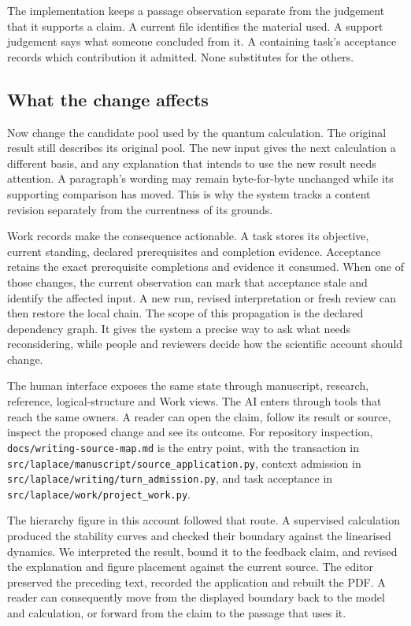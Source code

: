 The implementation keeps a passage observation separate from the judgement that it supports a claim. A current file identifies the material used. A support judgement says what someone concluded from it. A containing task's acceptance records which contribution it admitted. None substitutes for the others.

\subsection{What the change affects}
Now change the candidate pool used by the quantum calculation. The original result still describes its original pool. The new input gives the next calculation a different basis, and any explanation that intends to use the new result needs attention. A paragraph's wording may remain byte-for-byte unchanged while its supporting comparison has moved. This is why the system tracks a content revision separately from the currentness of its grounds.

Work records make the consequence actionable. A task stores its objective, current standing, declared prerequisites and completion evidence. Acceptance retains the exact prerequisite completions and evidence it consumed. When one of those changes, the current observation can mark that acceptance stale and identify the affected input. A new run, revised interpretation or fresh review can then restore the local chain. The scope of this propagation is the declared dependency graph. It gives the system a precise way to ask what needs reconsidering, while people and reviewers decide how the scientific account should change.

The human interface exposes the same state through manuscript, research, reference, logical-structure and Work views. The AI enters through tools that reach the same owners. A reader can open the claim, follow its result or source, inspect the proposed change and see its outcome. For repository inspection, \nolinkurl{docs/writing-source-map.md} is the entry point, with the transaction in \nolinkurl{src/laplace/manuscript/source_application.py}, context admission in \nolinkurl{src/laplace/writing/turn_admission.py}, and task acceptance in \nolinkurl{src/laplace/work/project_work.py}.

The hierarchy figure in this account followed that route. A supervised calculation produced the stability curves and checked their boundary against the linearised dynamics. We interpreted the result, bound it to the feedback claim, and revised the explanation and figure placement against the current source. The editor preserved the preceding text, recorded the application and rebuilt the PDF. A reader can consequently move from the displayed boundary back to the model and calculation, or forward from the claim to the passage that uses it.

